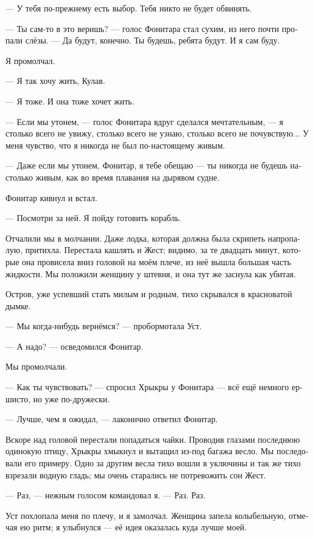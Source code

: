 \documentclass[a4paper,12pt,fleqn]{book}\usepackage{polyglossia}\setdefaultlanguage[babelshorthands=true]{russian}\setotherlanguage{english}\defaultfontfeatures{Ligatures=TeX,Mapping=tex-text}
\newcommand{\asterism}{\vspace{1em}{\centering\Large\bfseries$\ast~\ast~\ast$\par}\vspace{1em}}
\begin{document}
--- У тебя по-прежнему есть выбор.
Тебя никто не будет обвинять.

--- Ты сам-то в это веришь? --- голос Фонитара стал сухим, из него почти пропали слёзы.
--- Да будут, конечно.
Ты будешь, ребята будут.
И я сам буду.

Я промолчал.

--- Я так хочу жить, Кулав.

--- Я тоже.
И она тоже хочет жить.

--- Если мы утонем, --- голос Фонитара вдруг сделался мечтательным, --- я столько всего не увижу, столько всего не узнаю, столько всего не почувствую...
У меня чувство, что я никогда не был по-настоящему живым.

--- Даже если мы утонем, Фонитар, я тебе обещаю --- ты никогда не будешь настолько живым, как во время плавания на дырявом судне.

Фонитар кивнул и встал.

--- Посмотри за ней.
Я пойду готовить корабль.

\asterism

Отчалили мы в молчании.
Даже лодка, которая должна была скрипеть напропалую, притихла.
Перестала кашлять и Жест;
видимо, за те двадцать минут, которые она провисела вниз головой на моём плече, из неё вышла большая часть жидкости.
Мы положили женщину у штевня, и она тут же заснула как убитая.

Остров, уже успевший стать милым и родным, тихо скрывался в красноватой дымке.

--- Мы когда-нибудь вернёмся? --- пробормотала Уст.

--- А надо? --- осведомился Фонитар.

Мы промолчали.

--- Как ты чувствовать? --- спросил Хрыкры у Фонитара --- всё ещё немного ершисто, но уже по-дружески.

--- Лучше, чем я ожидал, --- лаконично ответил Фонитар.

Вскоре над головой перестали попадаться чайки.
Проводив глазами последнюю одинокую птицу, Хрыкры хмыкнул и вытащил из-под багажа весло.
Мы последовали его примеру.
Одно за другим весла тихо вошли в уключины и так же тихо взрезали водную гладь;
мы очень старались не потревожить сон Жест.

--- Раз, --- нежным голосом командовал я.
--- Раз.
Раз.

Уст похлопала меня по плечу, и я замолчал.
Женщина запела колыбельную, отмечая ею ритм;
я улыбнулся --- её идея оказалась куда лучше моей.
\end{document}
